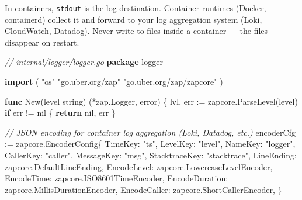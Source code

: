 \documentclass[
]{article}
\newenvironment{Shaded}{}{}
\newcommand{\CommentTok}[1]{\textcolor[rgb]{0.38,0.63,0.69}{\textit{#1}}}
\newcommand{\ControlFlowTok}[1]{\textcolor[rgb]{0.00,0.44,0.13}{\textbf{#1}}}
\newcommand{\DataTypeTok}[1]{\textcolor[rgb]{0.56,0.13,0.00}{#1}}
\newcommand{\KeywordTok}[1]{\textcolor[rgb]{0.00,0.44,0.13}{\textbf{#1}}}
\newcommand{\NormalTok}[1]{#1}
\newcommand{\OperatorTok}[1]{\textcolor[rgb]{0.40,0.40,0.40}{#1}}
\newcommand{\OtherTok}[1]{\textcolor[rgb]{0.00,0.44,0.13}{#1}}
\newcommand{\StringTok}[1]{\textcolor[rgb]{0.25,0.44,0.63}{#1}}
\begin{document}
In containers, \texttt{stdout} is the log destination. Container
runtimes (Docker, containerd) collect it and forward to your log
aggregation system (Loki, CloudWatch, Datadog). Never write to files
inside a container --- the files disappear on restart.

\begin{Shaded}
\begin{Highlighting}[]
\CommentTok{// internal/logger/logger.go}
\KeywordTok{package}\NormalTok{ logger}

\KeywordTok{import} \OperatorTok{(}
    \StringTok{"os"}
    \StringTok{"go.uber.org/zap"}
    \StringTok{"go.uber.org/zap/zapcore"}
\OperatorTok{)}

\KeywordTok{func}\NormalTok{ New}\OperatorTok{(}\NormalTok{level }\DataTypeTok{string}\OperatorTok{)} \OperatorTok{(*}\NormalTok{zap}\OperatorTok{.}\NormalTok{Logger}\OperatorTok{,} \DataTypeTok{error}\OperatorTok{)} \OperatorTok{\{}
\NormalTok{    lvl}\OperatorTok{,}\NormalTok{ err }\OperatorTok{:=}\NormalTok{ zapcore}\OperatorTok{.}\NormalTok{ParseLevel}\OperatorTok{(}\NormalTok{level}\OperatorTok{)}
    \ControlFlowTok{if}\NormalTok{ err }\OperatorTok{!=} \OtherTok{nil} \OperatorTok{\{}
        \ControlFlowTok{return} \OtherTok{nil}\OperatorTok{,}\NormalTok{ err}
    \OperatorTok{\}}

    \CommentTok{// JSON encoding for container log aggregation (Loki, Datadog, etc.)}
\NormalTok{    encoderCfg }\OperatorTok{:=}\NormalTok{ zapcore}\OperatorTok{.}\NormalTok{EncoderConfig}\OperatorTok{\{}
\NormalTok{        TimeKey}\OperatorTok{:}        \StringTok{"ts"}\OperatorTok{,}
\NormalTok{        LevelKey}\OperatorTok{:}       \StringTok{"level"}\OperatorTok{,}
\NormalTok{        NameKey}\OperatorTok{:}        \StringTok{"logger"}\OperatorTok{,}
\NormalTok{        CallerKey}\OperatorTok{:}      \StringTok{"caller"}\OperatorTok{,}
\NormalTok{        MessageKey}\OperatorTok{:}     \StringTok{"msg"}\OperatorTok{,}
\NormalTok{        StacktraceKey}\OperatorTok{:}  \StringTok{"stacktrace"}\OperatorTok{,}
\NormalTok{        LineEnding}\OperatorTok{:}\NormalTok{     zapcore}\OperatorTok{.}\NormalTok{DefaultLineEnding}\OperatorTok{,}
\NormalTok{        EncodeLevel}\OperatorTok{:}\NormalTok{    zapcore}\OperatorTok{.}\NormalTok{LowercaseLevelEncoder}\OperatorTok{,}
\NormalTok{        EncodeTime}\OperatorTok{:}\NormalTok{     zapcore}\OperatorTok{.}\NormalTok{ISO8601TimeEncoder}\OperatorTok{,}
\NormalTok{        EncodeDuration}\OperatorTok{:}\NormalTok{ zapcore}\OperatorTok{.}\NormalTok{MillisDurationEncoder}\OperatorTok{,}
\NormalTok{        EncodeCaller}\OperatorTok{:}\NormalTok{   zapcore}\OperatorTok{.}\NormalTok{ShortCallerEncoder}\OperatorTok{,}
    \OperatorTok{\}}


\end{Highlighting}
\end{Shaded}
\end{document}
